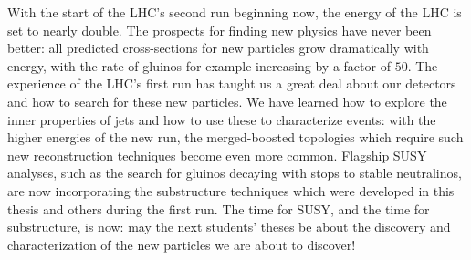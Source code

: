 With the start of the LHC's second run beginning now, the energy of the LHC is set to nearly double. The prospects for finding new physics have never been better: all predicted cross-sections for new particles grow dramatically with energy, with the rate of gluinos for example increasing by a factor of $50$. The experience of the LHC's first run has taught us a great deal about our detectors and how to search for these new particles. We have learned how to explore the inner properties of jets and how to use these to characterize events: with the higher energies of the new run, the merged-boosted topologies which require such new reconstruction techniques become even more common. Flagship SUSY analyses, such as the search for gluinos decaying with stops to stable neutralinos, are now incorporating the substructure techniques which were developed in this thesis and others during the first run. The time for SUSY, and the time for substructure, is now: may the next students' theses be about the discovery and characterization of the new particles we are about to discover!